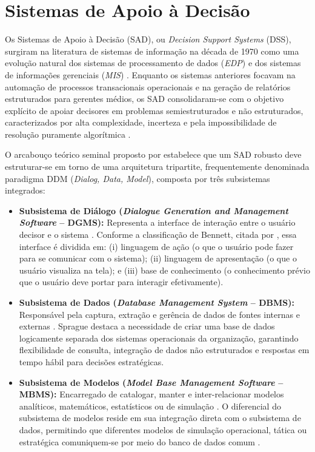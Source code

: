 \section{Sistemas de Apoio à Decisão}
\label{sec:sad}

Os Sistemas de Apoio à Decisão (SAD), ou \textit{Decision Support Systems} (DSS), surgiram na literatura de sistemas de informação na década de 1970 como uma evolução natural dos sistemas de processamento de dados (\textit{EDP}) e dos sistemas de informações gerenciais (\textit{MIS}) \cite{sprague1980framework}. Enquanto os sistemas anteriores focavam na automação de processos transacionais operacionais e na geração de relatórios estruturados para gerentes médios, os SAD consolidaram-se com o objetivo explícito de apoiar decisores em problemas semiestruturados e não estruturados, caracterizados por alta complexidade, incerteza e pela impossibilidade de resolução puramente algorítmica \cite{sprague1980framework}.

O arcabouço teórico seminal proposto por  estabelece que um SAD robusto deve estruturar-se em torno de uma arquitetura tripartite, frequentemente denominada paradigma DDM (\textit{Dialog, Data, Model}), composta por três subsistemas integrados:

\begin{itemize}
    \item \textbf{Subsistema de Diálogo (\textit{Dialogue Generation and Management Software} -- DGMS):} Representa a interface de interação entre o usuário decisor e o sistema \cite{sprague1980framework}. Conforme a classificação de Bennett, citada por , essa interface é dividida em: (i) linguagem de ação (o que o usuário pode fazer para se comunicar com o sistema); (ii) linguagem de apresentação (o que o usuário visualiza na tela); e (iii) base de conhecimento (o conhecimento prévio que o usuário deve portar para interagir efetivamente).
    \item \textbf{Subsistema de Dados (\textit{Database Management System} -- DBMS):} Responsável pela captura, extração e gerência de dados de fontes internas e externas \cite{sprague1980framework}. Sprague \cite{sprague1980framework} destaca a necessidade de criar uma base de dados logicamente separada dos sistemas operacionais da organização, garantindo flexibilidade de consulta, integração de dados não estruturados e respostas em tempo hábil para decisões estratégicas.
    \item \textbf{Subsistema de Modelos (\textit{Model Base Management Software} -- MBMS):} Encarregado de catalogar, manter e inter-relacionar modelos analíticos, matemáticos, estatísticos ou de simulação \cite{sprague1980framework}. O diferencial do subsistema de modelos reside em sua integração direta com o subsistema de dados, permitindo que diferentes modelos de simulação operacional, tática ou estratégica comuniquem-se por meio do banco de dados comum \cite{sprague1980framework}.
\end{itemize}

